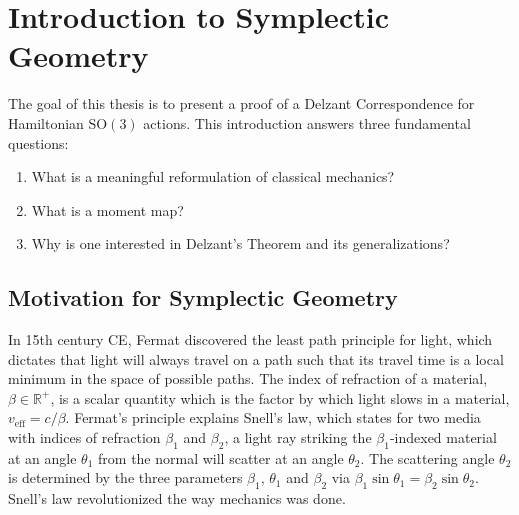 

\section{Introduction to Symplectic Geometry}

The goal of this thesis is to present a proof of a Delzant Correspondence for Hamiltonian $\text{SO}(3)$ actions. This introduction answers three fundamental questions:

\begin{enumerate}
    \item What is a meaningful reformulation of classical mechanics?
    \item What is a moment map?
    \item Why is one interested in Delzant's Theorem and its generalizations?
\end{enumerate}

\subsection{Motivation for Symplectic Geometry}

In 15th century CE, Fermat discovered the least path principle for light, which dictates that light will always travel on a path such that its travel time is a local minimum in the space of possible paths. The index of refraction of a material, $\beta \in \mathbb{R}^{+}$, is a scalar quantity which is the factor by which light slows in a material, $v_{\operatorname{eff}} = c/\beta$. Fermat's principle explains Snell's law, which states for two media with indices of refraction $\beta_{1}$ and $\beta_{2}$, a light ray striking the $\beta_{1}$-indexed material at an angle $\theta_{1}$ from the normal will scatter at an angle $\theta_{2}$. The scattering angle $\theta_{2}$ is determined by the three parameters $\beta_{1}$, $\theta_{1}$ and $\beta_{2}$ via $\beta_{1} \sin \theta_{1} = \beta_{2} \sin \theta_{2}$. Snell's law revolutionized the way mechanics was done. \bigskip 

